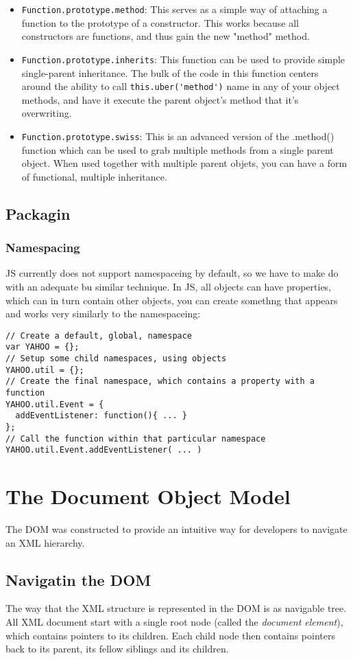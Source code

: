 \documentclass[a4paper,11pt]{book}
\begin{document}
\begin{itemize}
\item \verb|Function.prototype.method|: This serves as a simple way of attaching
a function to the prototype of a constructor. This works because all
constructors are functions, and thus gain the new "method" method.
\item \verb|Function.prototype.inherits|: This function can be used to provide
simple single-parent inheritance. The bulk of the code in this function centers
around the ability to call \verb|this.uber('method')| name in any of your object
methods, and have it execute the parent object's method that it's overwriting. 
\item \verb|Function.prototype.swiss|: This is an advanced version of the
.method() function which can be used to grab multiple methods from a single
parent object. When used together with multiple parent objets, you can have a
form of functional, multiple inheritance.
\end{itemize}
\section{Packagin}
\subsection{Namespacing}
JS currently does not support namespaceing by default, so we have to make do
with an adequate bu similar technique. In JS, all objects can have properties,
which can in turn contain other objects, you can create somethng that appears
and works very similarly to the namespaceing:
\begin{verbatim}
// Create a default, global, namespace
var YAHOO = {};
// Setup some child namespaces, using objects
YAHOO.util = {};
// Create the final namespace, which contains a property with a function
YAHOO.util.Event = {
  addEventListener: function(){ ... }
};
// Call the function within that particular namespace
YAHOO.util.Event.addEventListener( ... )
\end{verbatim}
\chapter{The Document Object Model}
The DOM was constructed to provide an intuitive way for developers to navigate
an XML hierarchy. 
\section{Navigatin the DOM}
The way that the XML structure is represented in the DOM is as navigable tree.
All XML document start with a single root node (called the \emph{document
element}), which contains pointers to its children. Each child node then
contains pointers back to its parent, its fellow siblings and its children.
\end{document}
